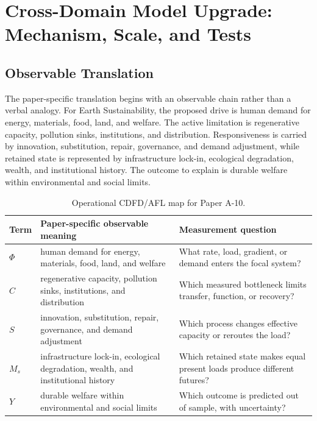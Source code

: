\documentclass[11pt,a4paper]{article}
\begin{document}
\section{Cross-Domain Model Upgrade: Mechanism, Scale, and Tests}

\subsection{Observable Translation}

The paper-specific translation begins with an observable chain rather than a
verbal analogy. For Earth Sustainability, the proposed drive is human demand for energy, materials, food, land, and welfare.
The active limitation is regenerative capacity, pollution sinks, institutions, and distribution. Responsiveness is carried by
innovation, substitution, repair, governance, and demand adjustment, while retained state is represented by
infrastructure lock-in, ecological degradation, wealth, and institutional history. The outcome to explain is durable welfare within environmental and social limits.

\begin{table}[htbp]
\centering
\small
\caption{Operational CDFD/AFL map for Paper A-10.}
\begin{tabularx}{\textwidth}{|l|X|X|}
\hline
\textbf{Term} & \textbf{Paper-specific observable meaning} & \textbf{Measurement question} \\
\hline
$\Phi$ & human demand for energy, materials, food, land, and welfare & What rate, load, gradient, or demand enters the focal system? \\
\hline
$C$ & regenerative capacity, pollution sinks, institutions, and distribution & Which measured bottleneck limits transfer, function, or recovery? \\
\hline
$S$ & innovation, substitution, repair, governance, and demand adjustment & Which process changes effective capacity or reroutes the load? \\
\hline
$M_s$ & infrastructure lock-in, ecological degradation, wealth, and institutional history & Which retained state makes equal present loads produce different futures? \\
\hline
$Y$ & durable welfare within environmental and social limits & Which outcome is predicted out of sample, with uncertainty? \\
\hline
\end{tabularx}
\end{table}
\end{document}
